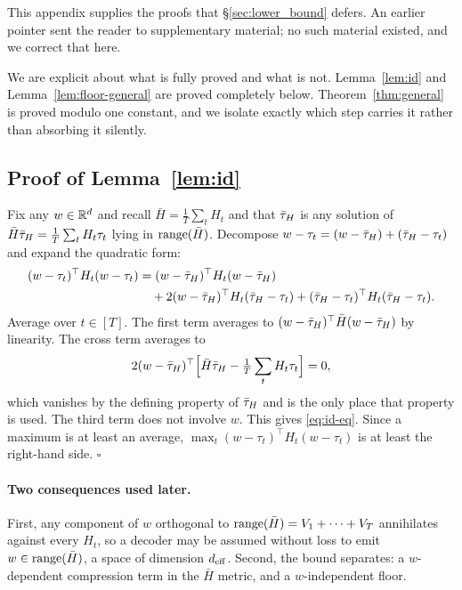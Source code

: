 This appendix supplies the proofs that \S\ref{sec:lower_bound} defers. An
earlier pointer sent the reader to supplementary material; no such material
existed, and we correct that here.

We are explicit about what is fully proved and what is not.
Lemma~\ref{lem:id} and Lemma~\ref{lem:floor-general} are proved completely
below. Theorem~\ref{thm:general} is proved modulo one constant, and we isolate
exactly which step carries it rather than absorbing it silently.

\subsection{Proof of Lemma~\ref{lem:id}}

Fix any $w \in \mathbb{R}^d$ and recall $\bar H = \frac1T\sum_t H_t$ and that $\bar{\tau}_H$
is any solution of $\bar H \bar{\tau}_H = \frac1T\sum_t H_t \tau_t$ lying in
$\operatorname{range}(\bar H)$. Decompose $w - \tau_t = (w - \bar{\tau}_H) + (\bar{\tau}_H - \tau_t)$ and
expand the quadratic form:
\begin{align*}
  (w-\tau_t)^\top H_t (w-\tau_t)
  &= (w-\bar{\tau}_H)^\top H_t (w-\bar{\tau}_H) \\
  &\quad + 2 (w-\bar{\tau}_H)^\top H_t (\bar{\tau}_H - \tau_t)
   + (\bar{\tau}_H-\tau_t)^\top H_t (\bar{\tau}_H-\tau_t).
\end{align*}
Average over $t \in [T]$. The first term averages to
$(w-\bar{\tau}_H)^\top \bar H (w-\bar{\tau}_H)$ by linearity. The cross term averages to
\begin{equation*}
  2 (w-\bar{\tau}_H)^\top\Bigl[\bar H \bar{\tau}_H - \tfrac1T\sum_t H_t \tau_t\Bigr] = 0,
\end{equation*}
which vanishes by the defining property of $\bar{\tau}_H$ and is the only place that
property is used. The third term does not involve $w$. This gives
\eqref{eq:id-eq}. Since a maximum is at least an average,
$\max_t (w-\tau_t)^\top H_t (w-\tau_t)$ is at least the right-hand side.
\hfill$\square$

\paragraph{Two consequences used later.} First, any component of $w$
orthogonal to $\operatorname{range}(\bar H) = V_1 + \cdots + V_T$ annihilates against every
$H_t$, so a decoder may be assumed without loss to emit
$w \in \operatorname{range}(\bar H)$, a space of dimension $d_{\mathrm{eff}}$. Second, the bound
separates: a $w$-dependent compression term in the $\bar H$ metric, and a
$w$-independent floor.

